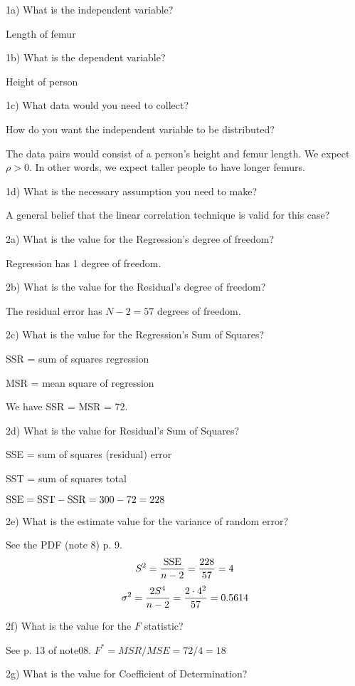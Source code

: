 \parindent=0pt

\beginsection
1a) What is the independent variable?

Length of femur

\beginsection
1b) What is the dependent variable?

Height of person

\beginsection
1c) What data would you need to collect?

How do you want the independent variable to be distributed?

The data pairs would consist of a person's height
and femur length.
We expect $\rho>0$. In other words, we expect
taller people to have longer femurs.

\beginsection
1d) What is the necessary assumption you need to make?

A general belief that the linear
correlation technique is valid for this case?



\beginsection
2a) What is the value for the Regression's degree of freedom?

Regression has 1 degree of freedom.

\beginsection
2b) What is the value for the Residual's degree of freedom?

The residual error has $N-2=57$ degrees of freedom.

\beginsection
2c) What is the value for the Regression's Sum of Squares?

SSR = sum of squares regression\par
MSR = mean square of regression\par
We have SSR = MSR = 72.

\beginsection
2d) What is the value for Residual's Sum of Squares?

SSE = sum of squares (residual) error\par
SST = sum of squares total\par
${\rm SSE}={\rm SST}-{\rm SSR}=300-72=228$

\beginsection
2e) What is the estimate value for the variance of random error?

See the PDF (note 8) p. 9.
$$S^2={{\rm SSE}\over n-2}={228\over 57}=4$$
$$\sigma^2={2S^4\over n-2}={2\cdot4^2\over57}=0.5614$$

\beginsection
2f) What is the value for the $F$ statistic?

See p. 13 of note08.
$F^*=MSR/MSE=72/4=18$

\beginsection
2g) What is the value for Coefficient of Determination?

